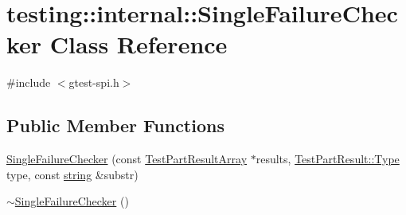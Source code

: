 \hypertarget{classtesting_1_1internal_1_1_single_failure_checker}{\section{testing\+:\+:internal\+:\+:Single\+Failure\+Checker Class Reference}
\label{classtesting_1_1internal_1_1_single_failure_checker}
}


{\ttfamily \#include $<$gtest-\/spi.\+h$>$}

\subsection*{Public Member Functions}
\begin{DoxyCompactItemize}
\item 
\hyperlink{classtesting_1_1internal_1_1_single_failure_checker_a6d350d385526c97c9982e928f5f8fb56}{Single\+Failure\+Checker} (const \hyperlink{classtesting_1_1_test_part_result_array}{Test\+Part\+Result\+Array} $\ast$results, \hyperlink{classtesting_1_1_test_part_result_a65ae656b33fdfdfffaf34858778a52d5}{Test\+Part\+Result\+::\+Type} type, const \hyperlink{namespacetesting_1_1internal_a8e8ff5b11e64078831112677156cb111}{string} \&substr)
\item 
\hyperlink{classtesting_1_1internal_1_1_single_failure_checker_a4b0a907c9c1b350c79d70af138e9f0bf}{$\sim$\+Single\+Failure\+Checker} ()
\end{DoxyCompactItemize}


